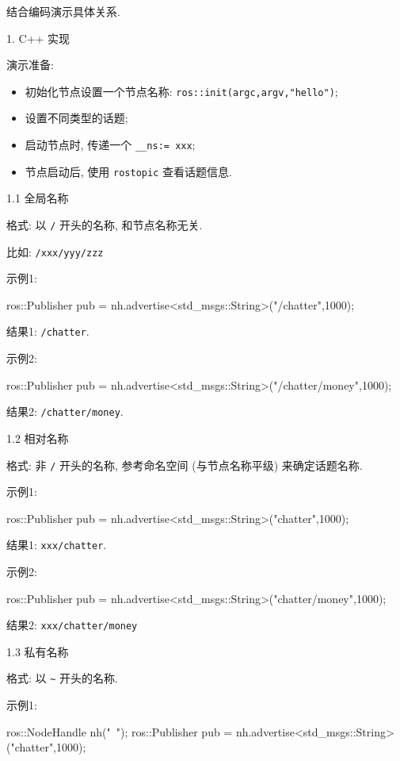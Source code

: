 \documentclass[openany, fontset=windowsold]{ctexbook}
\theoremstyle{kaiti}
\theoremstyle{normal}
\begin{document}
结合编码演示具体关系.

1. C++ 实现

演示准备:

\begin{itemize}
  \item 初始化节点设置一个节点名称: \verb|ros::init(argc,argv,"hello")|;
  \item 设置不同类型的话题;
  \item 启动节点时, 传递一个 \verb|__ns:= xxx|;
  \item 节点启动后, 使用 \verb|rostopic| 查看话题信息.
\end{itemize}

1.1 全局名称

格式: 以 \verb|/| 开头的名称, 和节点名称无关.

比如: \verb|/xxx/yyy/zzz|

示例1:

\begin{cpp}
  ros::Publisher pub = nh.advertise<std_msgs::String>("/chatter",1000);
\end{cpp}

结果1: \verb|/chatter|.

示例2:

\begin{cpp}
  ros::Publisher pub = nh.advertise<std_msgs::String>("/chatter/money",1000);
\end{cpp}

结果2: \verb|/chatter/money|.

1.2 相对名称

格式: 非 \verb|/| 开头的名称, 参考命名空间 (与节点名称平级) 来确定话题名称.

示例1:

\begin{cpp}
  ros::Publisher pub = nh.advertise<std_msgs::String>("chatter",1000);
\end{cpp}

结果1: \verb|xxx/chatter|.

示例2:

\begin{cpp}
  ros::Publisher pub = nh.advertise<std_msgs::String>("chatter/money",1000);
\end{cpp}

结果2: \verb|xxx/chatter/money|

1.3 私有名称

格式: 以 \verb|~| 开头的名称.

示例1:

\begin{cpp}
  ros::NodeHandle nh("~");
  ros::Publisher pub = nh.advertise<std_msgs::String>("chatter",1000);
\end{cpp}
\end{document}
